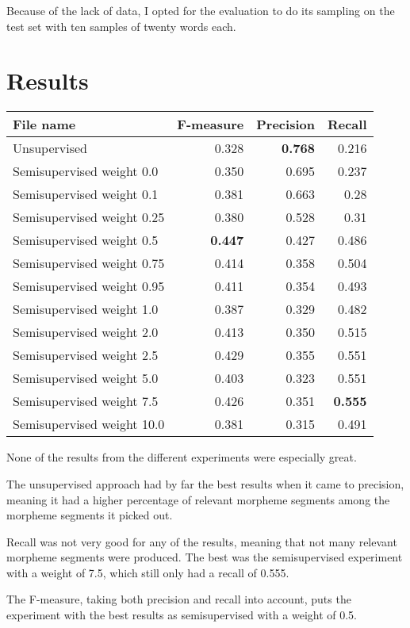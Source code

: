 \documentclass[10pt]{article}
\begin{document}
Because of the lack of data, I opted for the evaluation to do its sampling on the test set with ten samples of twenty words each.

\section{Results}
\begin{center}
	\begin{tabular}{l | r r r}
		File name & F-measure & Precision & Recall\\\hline\hline
		Unsupervised & 0.328 & \textbf{0.768} & 0.216 \\
		Semisupervised weight 0.0 & 0.350 & 0.695 & 0.237 \\
		Semisupervised weight 0.1 & 0.381 & 0.663 & 0.28 \\
		Semisupervised weight 0.25 & 0.380 & 0.528 & 0.31 \\
		Semisupervised weight 0.5 & \textbf{0.447} & 0.427 & 0.486 \\
		Semisupervised weight 0.75 & 0.414 & 0.358 & 0.504 \\
		Semisupervised weight 0.95 & 0.411 & 0.354 & 0.493 \\
		Semisupervised weight 1.0 & 0.387 & 0.329 & 0.482 \\
		Semisupervised weight 2.0 & 0.413 & 0.350 & 0.515 \\
		Semisupervised weight 2.5 & 0.429 & 0.355 & 0.551 \\
		Semisupervised weight 5.0 & 0.403 & 0.323 & 0.551 \\
		Semisupervised weight 7.5 & 0.426 & 0.351 & \textbf{0.555} \\
		Semisupervised weight 10.0 & 0.381 & 0.315 & 0.491\\
	\end{tabular}
\end{center}

None of the results from the different experiments were especially great. 

The unsupervised approach had by far the best results when it came to precision, meaning it had a higher percentage of relevant morpheme segments among the morpheme segments it picked out.

Recall was not very good for any of the results, meaning that not many relevant morpheme segments were produced. The best was the semisupervised experiment with a weight of 7.5, which still only had a recall of 0.555.

The F-measure, taking both precision and recall into account, puts the experiment with the best results as semisupervised with a weight of 0.5.
\end{document}
